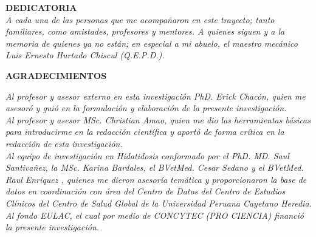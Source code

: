 \documentclass[12pt,a4paper,oneside]{report}
\begin{document}
\newpage
\newpage

\begin{titlepage}

\begin{flushright}
{\large \bf DEDICATORIA}
\\
\textit{A cada una de las personas que me acompañaron en este trayecto; tanto familiares, como amistades, profesores y mentores. A quienes siguen y a la memoria de quienes ya no están; en especial a mi abuelo, el maestro mecánico Luis Ernesto Hurtado Chiscul (Q.E.P.D.).} %
\\
\textit{}
\end{flushright}
\end{titlepage}


\begin{titlepage}

\begin{flushright}
{\large \bf AGRADECIMIENTOS}\\
\end{flushright}
\textit{Al profesor y asesor externo en esta investigación PhD. Erick Chacón, quien me asesoró y guió en la formulación y elaboración de la presente investigación.\\
Al profesor y asesor MSc. Christian Amao, quien me dio las herramientas básicas para introducirme en la redacción científica y aportó de forma crítica en la redacción de esta investigación.\\
Al equipo de investigación en Hidatidosis conformado por el PhD. MD. Saul Santivañez, la MSc. Karina Bardales,  el BVetMed. Cesar Sedano y el BVetMed. Raul Enriquez , quienes me dieron asesoría temática y proporcionaron la base de datos en coordinación con área del Centro de Datos del Centro de Estudios Clínicos del Centro de Salud Global de la Universidad Peruana Cayetano Heredia.\\
Al fondo EULAC, el cual por medio de CONCYTEC (PRO CIENCIA) financió la presente investigación.
} 

\end{titlepage}
\end{document}
